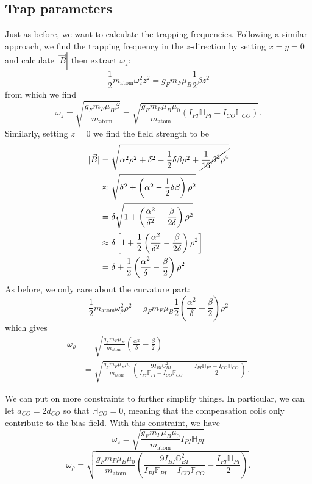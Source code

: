 \documentclass{article}
\theoremstyle{definition}
\newcommand{\al}{\alpha}
\newcommand{\be}{\beta}
\newcommand{\f}[2]{\frac{#1}{#2}}
\newcommand{\lp}{\left(}
\newcommand{\rp}{\right)}
\newcommand{\lb}{\left[}
\newcommand{\rb}{\right]}
\begin{document}
\subsection{Trap parameters}

Just as before, we want to calculate the trapping frequencies. Following a similar approach, we find the trapping frequency in the $z$-direction by setting $x=y=0$ and calculate $|\vec{B}|$ then extract $\omega_z$:
\begin{equation*}
\f{1}{2}m_\text{atom} \omega_z^2 z^2 = g_F m_F \mu_B\f{1}{2}\beta z^2
\end{equation*}
from which we find 
\begin{equation*}
\omega_z = \sqrt{\f{ g_F m_F \mu_B \beta}{m_\text{atom}}} = \sqrt{\f{g_F m_F \mu_B\mu_0 }{m_\text{atom}}\lp I_{PI}\mathbb{H}_{PI} - I_{CO}\mathbb{H}_{CO} \rp }.
\end{equation*}
Similarly, setting $z=0$ we find the field strength to be 
\begin{align*}
|\vec{B}| &= \sqrt{\al^2 \rho^2 + \delta^2 - \f{1}{2}\delta \beta \rho^2 + \cancel{\f{1}{16}\be^2 \rho^4}}\\
&\approx \sqrt{\delta^2 + \lp  \al^2 - \f{1}{2}\delta \beta\rp\rho^2} \\
&= \delta \sqrt{1 + \lp \f{\al^2}{\delta^2} - \f{\beta}{2\delta} \rp\rho^2 }\\
&\approx \delta \lb 1 + \f{1}{2}\lp \f{\al^2}{\delta^2} - \f{\be}{2\delta} \rp \rho^2 \rb\\
&= \delta + \f{1}{2}\lp \f{\al^2}{\delta} - \f{\beta}{2} \rp \rho^2
\end{align*}
As before, we only care about the curvature part:
\begin{equation*}
\f{1}{2}m_\text{atom} \omega_\rho^2 \rho^2 = g_F m_F \mu_B \f{1}{2}\lp \f{\al^2}{\delta} - \f{\beta}{2} \rp\rho^2
\end{equation*}
which gives
\begin{align*}
\omega_\rho &= \sqrt{\f{g_F m_F \mu_B}{m_\text{atom}} \lp \f{\al^2}{\delta} - \f{\be}{2} \rp  } \\
&= \sqrt{\f{g_F m_F \mu_B \mu_0}{m_\text{atom}} \lp \f{9I_{BI}\mathbb{G}_{BI}^2}{ I_{PI} \mathbb{F}_{PI} -  I_{CO} \mathbb{F}_{CO} }  - \f{ I_{PI}\mathbb{H}_{PI} - I_{CO}\mathbb{H}_{CO}}{2} \rp }.
\end{align*}



We can put on more constraints to further simplify things. In particular, we can let $a_{CO} = 2d_{CO}$ so that $\mathbb{H}_{CO} = 0$, meaning that the compensation coils only contribute to the bias field. With this constraint, we have
\begin{equation*}
\omega_z = \sqrt{\f{g_F m_F \mu_B\mu_0 }{m_\text{atom}} I_{PI}\mathbb{H}_{PI}  }
\end{equation*}
\begin{equation*}
\omega_\rho = \sqrt{\f{g_F m_F \mu_B \mu_0}{m_\text{atom}} \lp \f{9I_{BI}\mathbb{G}_{BI}^2}{ I_{PI} \mathbb{F}_{PI} -  I_{CO} \mathbb{F}_{CO} }  - \f{ I_{PI}\mathbb{H}_{PI} }{2} \rp }.
\end{equation*}
\end{document}
